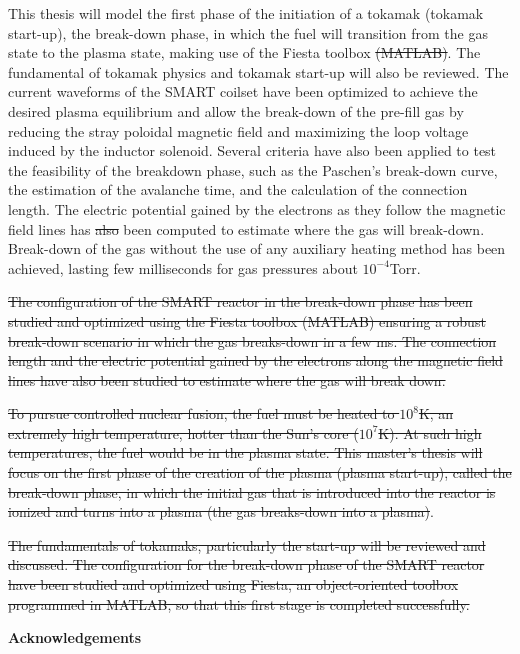 \documentclass[a4paper,12pt,oneside]{book}
\begin{document}
This thesis will model the first phase of the initiation of a tokamak (tokamak start-up), the break-down phase, in which the fuel will transition from the gas state to the plasma state, making use of the Fiesta toolbox \st{(MATLAB)}. The fundamental of tokamak physics and tokamak start-up will also be reviewed. The current waveforms of the SMART coilset have been optimized to achieve the desired plasma equilibrium and allow the break-down of the pre-fill gas by reducing the stray poloidal magnetic field and maximizing the loop voltage induced by the inductor solenoid. Several criteria have also been applied to test the feasibility of the breakdown phase, such as the Paschen's break-down curve, the estimation of the avalanche time, and the calculation of the connection length. The electric potential gained by the electrons as they follow the magnetic field lines has \st{also} been computed to estimate where the gas will break-down. Break-down of the gas without the use of any auxiliary heating method has been achieved, lasting few milliseconds for gas pressures about $10^{-4}$Torr.




\st{The configuration of the SMART reactor in the break-down phase has been studied and optimized using the Fiesta toolbox (MATLAB) ensuring a robust break-down scenario in which the gas breaks-down in a few ms. The connection length and the electric potential gained by the electrons along the magnetic field lines have also been studied to estimate where the gas will break down.}

\st{To pursue controlled nuclear fusion, the fuel must be heated to $10^8$K, an extremely high temperature, hotter than the Sun's core ($10^7$K). At such high temperatures, the fuel would be in the plasma state. This master's thesis will focus on the first phase of the creation of the plasma (plasma start-up), called the break-down phase, in which the initial gas that is introduced into the reactor is ionized and turns into a plasma (the gas breaks-down into a plasma)}.

\st{The fundamentals of tokamaks, particularly the start-up will be reviewed and discussed. The configuration for the break-down phase of the SMART reactor have been studied and optimized using Fiesta, an object-oriented toolbox programmed in MATLAB, so that this first stage is completed successfully.}


\newpage

\begin{center}
\begin{large}
\textbf{Acknowledgements}
\end{large}

\end{center}
\end{document}
